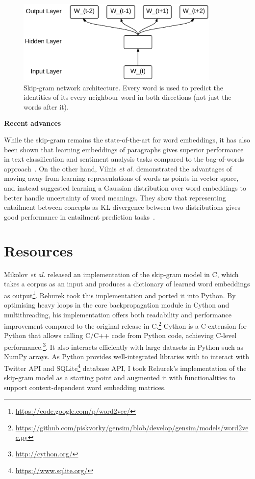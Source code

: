 \documentclass[a4paper,12pt,twoside,openright]{report}
\newcommand{\tb}{\vspace{10pt} \textbf}
\newcommand{\ti}{\textit}
\begin{document}
\begin{figure}[htbp]
    \centering
    \includegraphics[width=10cm]{figs/skipgram2.png}
    \caption[Skip-gram network architecture.]{Skip-gram network architecture. Every word is used to predict the identities of its every neighbour word in both directions (not just the words after it).}
    \label{fig:chap2:skipgram}
\end{figure}

\tb{Recent advances}

While the skip-gram remains the state-of-the-art for word embeddings, it has also been shown that learning embeddings of paragraphs gives superior performance in text classification and sentiment analysis tasks compared to the bag-of-words approach~\cite{le14}. On the other hand, Vilnis \ti{et al.} demonstrated the advantages of moving away from learning representations of words as points in vector space, and instead suggested learning a Gaussian distribution over word embeddings to better handle uncertainty of word meanings. They show that representing entailment between concepts as KL divergence between two distributions gives good performance in entailment prediction tasks~\cite{vilnis14}.

\section{Resources}

Mikolov \ti{et al.} released an implementation of the skip-gram model in C, which takes a corpus as an input and produces a dictionary of learned word embeddings as output\footnote{\url{https://code.google.com/p/word2vec/}}. Rehurek took this implementation and ported it into Python. By optimising heavy loops in the core backpropagation module in Cython and multithreading, his implementation offers both readability and performance improvement compared to the original release in C.\footnote{\url{https://github.com/piskvorky/gensim/blob/develop/gensim/models/word2vec.py}} Cython is a C-extension for Python that allows calling C/C++ code from Python code, achieving C-level performance.\footnote{\url{http://cython.org/}}. It also interacts efficiently with large datasets in Python such as NumPy arrays. As Python provides well-integrated libraries with to interact with Twitter API and SQLite\footnote{\url{https://www.sqlite.org/}} database API, I took Rehurek's implementation of the skip-gram model as a starting point and augmented it with functionalities to support context-dependent word embedding matrices.
\end{document}

